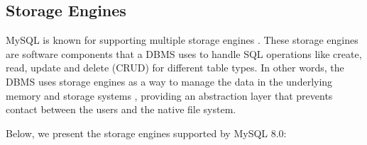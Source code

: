 \documentclass[12pt]{article}
\begin{document}
\subsection{Storage Engines}
\label{storageEngines}
MySQL is known for supporting multiple storage engines \parencite{ENGINES}. These storage engines are software components that a DBMS uses to handle SQL operations like create, read, update and delete (CRUD) for different table types. In other words, the DBMS uses storage engines as a way to manage the data in the underlying memory and storage systems \parencite{GUIDE_ENGINES}, providing an abstraction layer that prevents contact between the users and the native file system.

\vspace{0.3cm}

\noindent Below, we present the storage engines supported by MySQL 8.0:
\end{document}
